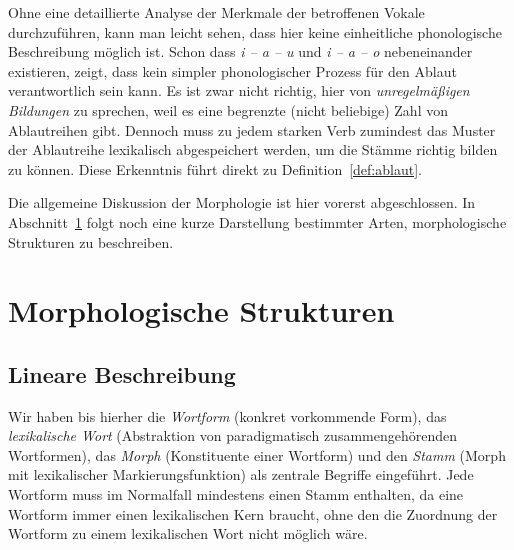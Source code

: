 Ohne eine detaillierte Analyse der Merkmale der betroffenen Vokale durchzuführen, kann man leicht sehen, dass hier keine einheitliche phonologische Beschreibung möglich ist.
Schon dass \textit{i -- a -- u} und \textit{i -- a -- o} nebeneinander existieren, zeigt, dass kein simpler phonologischer Prozess für den Ablaut verantwortlich sein kann.
Es ist zwar nicht richtig, hier von \textit{unregelmäßigen Bildungen} zu sprechen, weil es eine begrenzte (nicht beliebige) Zahl von Ablautreihen gibt.
Dennoch muss zu jedem starken Verb zumindest das Muster der Ablautreihe lexikalisch abgespeichert werden, um die Stämme richtig bilden zu können.
Diese Erkenntnis führt direkt zu Definition~\ref{def:ablaut}.




Die allgemeine Diskussion der Morphologie ist hier vorerst abgeschlossen.
In Abschnitt~\ref{sec:morphologischestrukturen} folgt noch eine kurze Darstellung bestimmter Arten, morphologische Strukturen zu beschreiben.




\section{Morphologische Strukturen}
\label{sec:morphologischestrukturen}


\subsection{Lineare Beschreibung}
\label{sec:linearebeschreibung}

Wir haben bis hierher die \textit{Wortform} (konkret vorkommende Form), das \textit{lexikalische Wort} (Abstraktion von paradigmatisch zusammengehörenden Wortformen), das \textit{Morph} (Konstituente einer Wortform) und den \textit{Stamm} (Morph mit lexikalischer Markierungsfunktion) als zentrale Begriffe eingeführt.
Jede Wortform muss im Normalfall mindestens einen Stamm enthalten, da eine Wortform immer einen lexikalischen Kern braucht, ohne den die Zuordnung der Wortform zu einem lexikalischen Wort nicht möglich wäre.

